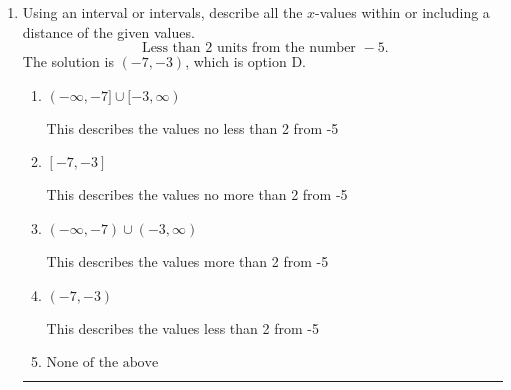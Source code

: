 \documentclass{extbook}[14pt]
\newcommand{\litem}[1]{\item #1

\rule{\textwidth}{0.4pt}}
\begin{document}
\begin{enumerate}
{\begin{enumerate}[label=\Alph*.]
$(-\infty, 9.60] \cup (3.26, \infty)$, which corresponds to displaying the and-inequality as an or-inequality AND flipping the inequality AND getting negatives of the actual endpoints.
\item \( (a, b], \text{ where } a \in [9, 12] \text{ and } b \in [2.25, 6.75] \)

$(9.60, 3.26]$, which is the correct interval but negatives of the actual endpoints.
\item \( (-\infty, a) \cup [b, \infty), \text{ where } a \in [6.75, 10.5] \text{ and } b \in [0.75, 5.25] \)

$(-\infty, 9.60) \cup [3.26, \infty)$, which corresponds to displaying the and-inequality as an or-inequality and getting negatives of the actual endpoints.
\item \( [a, b), \text{ where } a \in [8.25, 12] \text{ and } b \in [0.75, 5.25] \)

$[9.60, 3.26)$, which corresponds to flipping the inequality and getting negatives of the actual endpoints.
\item \( \text{None of the above.} \)

* This is correct as the answer should be $(-9.60, -3.26]$.
\end{enumerate}

\textbf{General Comment:} To solve, you will need to break up the compound inequality into two inequalities. Be sure to keep track of the inequality! It may be best to draw a number line and graph your solution.
}
\litem{
Using an interval or intervals, describe all the $x$-values within or including a distance of the given values.
\[ \text{ Less than } 2 \text{ units from the number } -5. \]The solution is \( (-7, -3) \), which is option D.\begin{enumerate}[label=\Alph*.]
\item \( (-\infty, -7] \cup [-3, \infty) \)

This describes the values no less than 2 from -5
\item \( [-7, -3] \)

This describes the values no more than 2 from -5
\item \( (-\infty, -7) \cup (-3, \infty) \)

This describes the values more than 2 from -5
\item \( (-7, -3) \)

This describes the values less than 2 from -5
\item \( \text{None of the above} \)


\end{enumerate}}
\end{enumerate}
\end{document}
